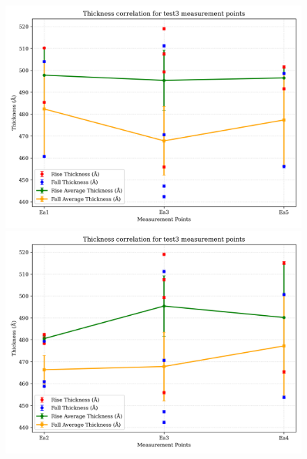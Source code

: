 \documentclass[platex,dvipdfmx,10pt,twoside,a4paper,jis2004]{jsarticle}
\begin{document}
\begin{figure}[H]
    \centering
    \begin{minipage}[t]{0.48\textwidth}
        \centering
        \includegraphics[width=\linewidth]{thickness_correlation_test3_Ea1-3-5.png}
    \end{minipage}
    \hfill
    \begin{minipage}[t]{0.48\textwidth}
        \centering
        \includegraphics[width=\linewidth]{thickness_correlation_test3_Ea2-3-4.png}
    \end{minipage}
    \label{fig:test3_ea_correlations}
\end{figure}
\clearpage
\end{document}
